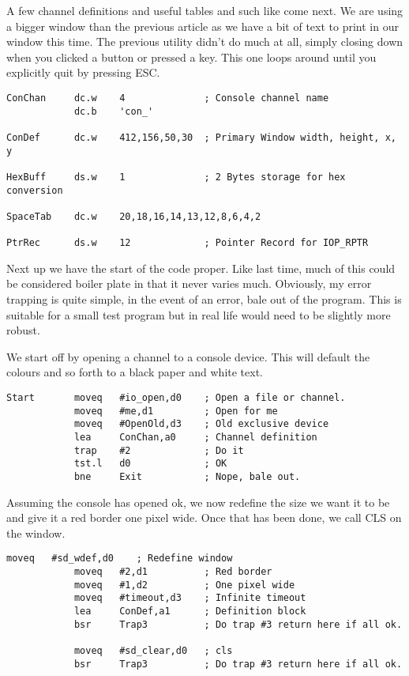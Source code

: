 A few channel definitions and useful tables and such like come next. We are using a bigger
window than the previous article as we have a bit of text to print in our window this
time. The previous utility didn't do much at all, simply closing down when you clicked a
button or pressed a key. This one loops around until you explicitly quit by pressing
ESC.

\begin{lstlisting}[firstnumber=last,caption={Pointer Record Examiner - Definitions}]
ConChan     dc.w    4              ; Console channel name 
            dc.b    'con_'

ConDef      dc.w    412,156,50,30  ; Primary Window width, height, x, y

HexBuff     ds.w    1              ; 2 Bytes storage for hex conversion

SpaceTab    dc.w    20,18,16,14,13,12,8,6,4,2

PtrRec      ds.w    12             ; Pointer Record for IOP_RPTR
\end{lstlisting}

Next up we have the start of the code proper. Like last time, much of this could be
considered boiler plate in that it never varies much. Obviously, my error trapping is
quite simple, in the event of an error, bale out of the program. This is suitable for a
small test program but in real life would need to be slightly more robust.

We start off by opening a channel to a console device. This will default the colours and
so forth to a black paper and white text.

\begin{lstlisting}[firstnumber=last,caption={Pointer Record Examiner - Open Console}]
Start       moveq   #io_open,d0    ; Open a file or channel.
            moveq   #me,d1         ; Open for me
            moveq   #OpenOld,d3    ; Old exclusive device
            lea     ConChan,a0     ; Channel definition
            trap    #2             ; Do it
            tst.l   d0             ; OK
            bne     Exit           ; Nope, bale out.
\end{lstlisting}

Assuming the console has opened ok, we now redefine the size we want it to be and give it
a red border one pixel wide. Once that has been done, we call CLS on the window.

\begin{lstlisting}[firstnumber=last,caption={Pointer Record Examiner - Redefine Console}]
            moveq   #sd_wdef,d0    ; Redefine window
            moveq   #2,d1          ; Red border
            moveq   #1,d2          ; One pixel wide
            moveq   #timeout,d3    ; Infinite timeout
            lea     ConDef,a1      ; Definition block
            bsr     Trap3          ; Do trap #3 return here if all ok.

            moveq   #sd_clear,d0   ; cls
            bsr     Trap3          ; Do trap #3 return here if all ok.
\end{lstlisting}

